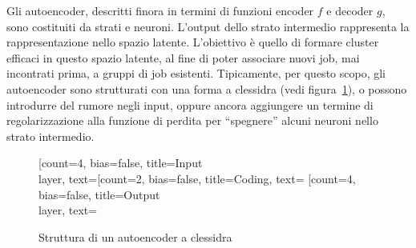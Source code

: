 Gli autoencoder, descritti finora in termini di funzioni encoder $f$ e decoder
$g$, sono costituiti da strati e neuroni. L'output dello strato intermedio
rappresenta la rappresentazione nello spazio latente. L'obiettivo è quello di
formare cluster efficaci in questo spazio latente, al fine di poter associare
nuovi job, mai incontrati prima, a gruppi di job esistenti. Tipicamente, per
questo scopo, gli autoencoder sono strutturati con una forma a clessidra (vedi
figura~\ref{fig:autoencoder}), o possono introdurre del rumore negli input,
oppure ancora aggiungere un termine di regolarizzazione alla funzione di
perdita per ``spegnere'' alcuni neuroni nello strato intermedio.

\begin{figure}[!hb]
    \centering 
    \begin{neuralnetwork}[height=4]
        \newcommand{\nodetextclear}[2]{}
        [count=4, bias=false, title=Input\\layer, text=\nodetextclear]
        \hiddenlayer[count=2, bias=false, title=Coding,  text=\nodetextclear] \linklayers 
        \outputlayer[count=4, bias=false,  title=Output\\layer, text=\nodetextclear] \linklayers       
    \end{neuralnetwork}
    \caption{Struttura di un autoencoder a clessidra}
    \label{fig:autoencoder}
\end{figure}
